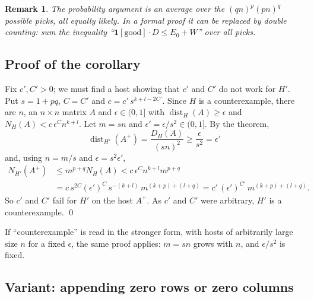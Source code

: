 \documentclass{article}
\DeclareMathOperator{\dist}{dist}
\theoremstyle{plain}
\newtheorem{remark}[theorem]{Remark}
\theoremstyle{definition}
\begin{document}
\begin{remark}
The probability argument is an average over the $(qn)^p (pn)^q$ possible picks, all equally
likely. In a formal proof it can be replaced by double counting: sum the inequality
``$\mathbf{1}[\text{good}]\cdot D \le E_0 + W$'' over all picks.
\end{remark}

\subsection*{Proof of the corollary}

Fix $c', C' > 0$; we must find a host showing that $c'$ and $C'$ do not work for $H'$. Put
$s = 1 + pq$, $C = C'$ and $c = c'\, s^{k+l-2C'}$. Since $H$ is a counterexample, there are $n$, an $n \times n$ matrix $A$
and $\epsilon \in (0,1]$ with $\dist_H(A) \ge \epsilon$ and $N_H(A) < c\,\epsilon^C n^{k+l}$.
Let $m = sn$ and $\epsilon' = \epsilon/s^2 \in (0,1]$. By the theorem,
\[
\dist_{H'}(A^+) = \frac{D_H(A)}{(sn)^2} \ge \frac{\epsilon}{s^2} = \epsilon'
\]
and, using $n = m/s$ and $\epsilon = s^2 \epsilon'$,
\begin{align*}
N_{H'}(A^+) &\le m^{p+q} N_H(A) < c\,\epsilon^{C} n^{k+l} m^{p+q}\\
&= c\, s^{2C}(\epsilon')^{C}\, s^{-(k+l)}\, m^{(k+p)+(l+q)}
= c'\,(\epsilon')^{C'}\, m^{(k+p)+(l+q)} .
\end{align*}
So $c'$ and $C'$ fail for $H'$ on the host $A^+$. As $c'$ and $C'$ were arbitrary, $H'$ is a
counterexample. \qed

\medskip
If ``counterexample'' is read in the stronger form, with hosts of arbitrarily large size $n$
for a fixed $\epsilon$, the same proof applies: $m = sn$ grows with $n$, and $\epsilon/s^2$ is
fixed.

\subsection*{Variant: appending zero rows or zero columns}
\end{document}
